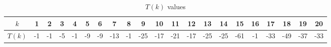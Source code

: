 \documentclass[11pt,reqno]{amsart}
\theoremstyle{plain}
\numberwithin{equation}{section}
\begin{document}
\begin{table}[!htb]
  \caption{$T(k)$ values}
  \centering
  \small %
  \setlength{\tabcolsep}{3pt} %
  \begin{tabular}{|c|c|c|c|c|c|c|c|c|c|c|c|c|c|c|c|c|c|c|c|c|}
    \hline
    \textbf{$k$}& 1& 2& 3& 4& 5& 6& 7& 8& 9& 10& 11& 12& 13& 14& 15& 16& 17& 18& 19& 20\\
    \hline
    \textbf{$T(k)$} &-1 & -1& -5& -1& -9& -9& -13& -1& -25& -17& -21& -17& -25& -25& -61& -1& -33& -49& -37& -33\\
    \hline
  \end{tabular}
\end{table}

\end{document}
